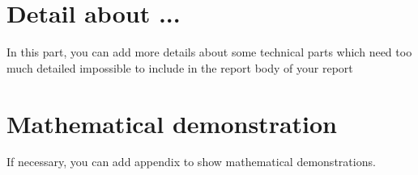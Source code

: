\appendix

\chapter{Detail about ...}

In this part, you can add more details about some technical parts which need too much detailed impossible to include in the report body of your report








\chapter{Mathematical demonstration}

If necessary, you can add appendix to show mathematical demonstrations.
